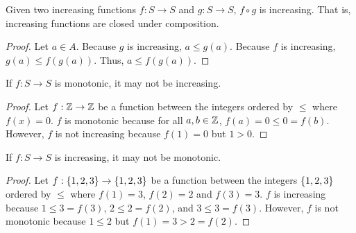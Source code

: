 \documentclass{mwhittaker}
\begin{document}
\begin{claim}\label{clm:increasing-closed}
  Given two increasing functions $f: S \to S$ and $g: S \to S$, $f \circ g$ is
  increasing. That is, increasing functions are closed under composition.
\end{claim}
\begin{proof}
  Let $a \in A$. Because $g$ is increasing, $a \leq g(a)$. Because $f$ is
  increasing, $g(a) \leq f(g(a))$. Thus, $a \leq f(g(a))$.
\end{proof}

\begin{claim}\label{clm:monotonic-to-increasing}
  If $f: S \to S$ is monotonic, it may not be increasing.
\end{claim}
\begin{proof}
  Let $f: \mathbb{Z} \to \mathbb{Z}$ be a function between the integers ordered by $\leq$
  where $f(x) = 0$. $f$ is monotonic because for all $a, b \in \mathbb{Z}$, $f(a) =
  0 \leq 0 = f(b)$. However, $f$ is not increasing because $f(1) = 0$ but $1 >
  0$.
\end{proof}

\begin{claim}\label{clm:increasing-to-monotonic}
  If $f: S \to S$ is increasing, it may not be monotonic.
\end{claim}
\begin{proof}
  Let $f: \{1,2,3\} \to \{1,2,3\}$ be a function between the integers
  $\{1, 2, 3\}$ ordered by $\leq$ where $f(1) = 3$, $f(2) = 2$ and $f(3) =
  3$. $f$ is increasing because $1 \leq 3 = f(3)$, $2 \leq 2 = f(2)$, and $3
  \leq 3 = f(3)$. However, $f$ is not monotonic because $1 \leq 2$ but $f(1) =
  3 > 2 = f(2)$.
\end{proof}
\end{document}
